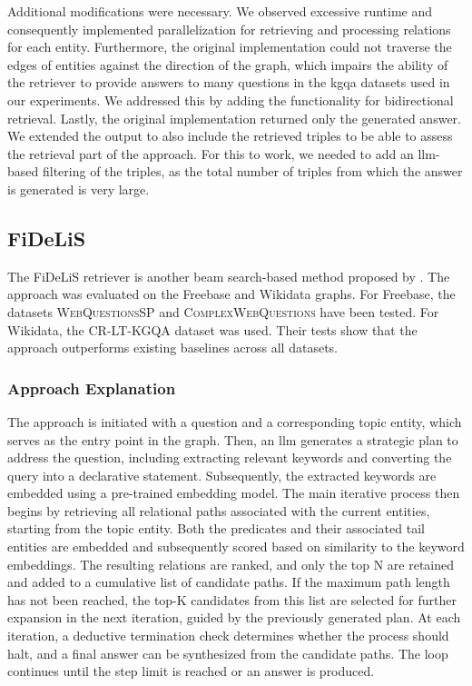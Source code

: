 Additional modifications were necessary. We observed excessive runtime and consequently implemented parallelization for retrieving and processing relations for each entity. Furthermore, the original implementation could not traverse the edges of entities against the direction of the graph, which impairs the ability of the retriever to provide answers to many questions in the \gls{kgqa} datasets used in our experiments. We addressed this by adding the functionality for bidirectional retrieval. Lastly, the original implementation returned only the generated answer. We extended the output to also include the retrieved triples to be able to assess the retrieval part of the approach. For this to work, we needed to add an \gls{llm}-based filtering of the triples, as the total number of triples from which the answer is generated is very large.

\subsection{FiDeLiS}

The FiDeLiS retriever is another beam search-based method proposed by \textcite{sui_fidelis_2024}. The approach was evaluated on the Freebase and Wikidata graphs. For Freebase, the datasets \textsc{WebQuestionsSP} and \textsc{ComplexWebQuestions} have been tested. For Wikidata, the \textsc{CR-LT-KGQA} dataset was used. Their tests show that the approach outperforms existing baselines across all datasets.

\subsubsection{Approach Explanation} 
The approach is initiated with a question and a corresponding topic entity, which serves as the entry point in the graph. Then, an \gls{llm} generates a strategic plan to address the question, including extracting relevant keywords and converting the query into a declarative statement. Subsequently, the extracted keywords are embedded using a pre-trained embedding model. The main iterative process then begins by retrieving all relational paths associated with the current entities, starting from the topic entity. Both the predicates and their associated tail entities are embedded and subsequently scored based on similarity to the keyword embeddings. The resulting relations are ranked, and only the top N are retained and added to a cumulative list of candidate paths. If the maximum path length has not been reached, the top-K candidates from this list are selected for further expansion in the next iteration, guided by the previously generated plan. At each iteration, a deductive termination check determines whether the process should halt, and a final answer can be synthesized from the candidate paths. The loop continues until the step limit is reached or an answer is produced.

